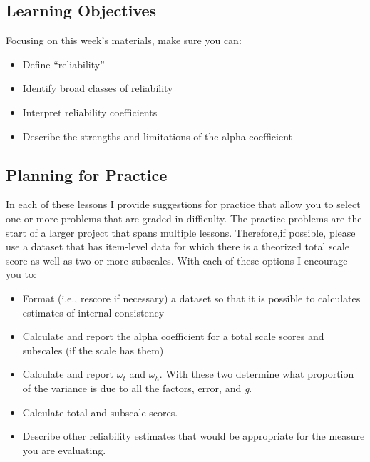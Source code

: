 \documentclass[
  english,
]{book}
\providecommand{\tightlist}{%
  \setlength{\itemsep}{0pt}\setlength{\parskip}{0pt}}
\begin{document}
\hypertarget{learning-objectives-2}{%
\subsection{Learning Objectives}\label{learning-objectives-2}}

Focusing on this week's materials, make sure you can:

\begin{itemize}
\tightlist
\item
  Define ``reliability''
\item
  Identify broad classes of reliability
\item
  Interpret reliability coefficients
\item
  Describe the strengths and limitations of the alpha coefficient
\end{itemize}

\hypertarget{planning-for-practice-2}{%
\subsection{Planning for Practice}\label{planning-for-practice-2}}

In each of these lessons I provide suggestions for practice that allow you to select one or more problems that are graded in difficulty. The practice problems are the start of a larger project that spans multiple lessons. Therefore,if possible, please use a dataset that has item-level data for which there is a theorized total scale score as well as two or more subscales. With each of these options I encourage you to:

\begin{itemize}
\tightlist
\item
  Format (i.e., rescore if necessary) a dataset so that it is possible to calculates estimates of internal consistency
\item
  Calculate and report the alpha coefficient for a total scale scores and subscales (if the scale has them)
\item
  Calculate and report \(\omega_{t}\) and \(\omega_{h}\). With these two determine what proportion of the variance is due to all the factors, error, and \emph{g}.
\item
  Calculate total and subscale scores.
\item
  Describe other reliability estimates that would be appropriate for the measure you are evaluating.
\end{itemize}
\end{document}
